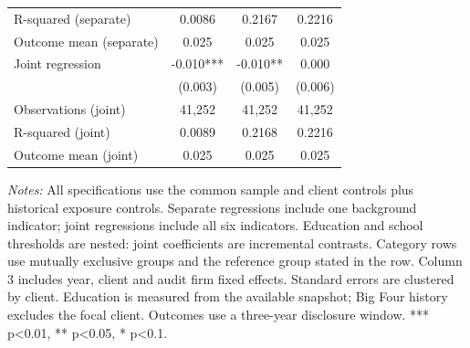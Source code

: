 \begin{table}[htbp]
\begin{threeparttable}
\begin{tabular}{p{}ccc}
R-squared (separate) & 0.0086 & 0.2167 & 0.2216 \\
Outcome mean (separate) & 0.025 & 0.025 & 0.025 \\
Joint regression & -0.010*** & -0.010** & 0.000 \\
 & (0.003) & (0.005) & (0.006) \\
Observations (joint) & 41,252 & 41,252 & 41,252 \\
R-squared (joint) & 0.0089 & 0.2168 & 0.2216 \\
Outcome mean (joint) & 0.025 & 0.025 & 0.025 \\
\bottomrule
\end{tabular}
\begin{tablenotes}\footnotesize
\item \raggedright \textit{Notes:} All specifications use the common sample and client controls plus historical exposure controls. Separate regressions include one background indicator; joint regressions include all six indicators. Education and school thresholds are nested: joint coefficients are incremental contrasts. Category rows use mutually exclusive groups and the reference group stated in the row. Column 3 includes year, client and audit firm fixed effects. Standard errors are clustered by client. Education is measured from the available snapshot; Big Four history excludes the focal client. Outcomes use a three-year disclosure window. *** p<0.01, ** p<0.05, * p<0.1.
\end{tablenotes}
\end{threeparttable}
\end{table}
